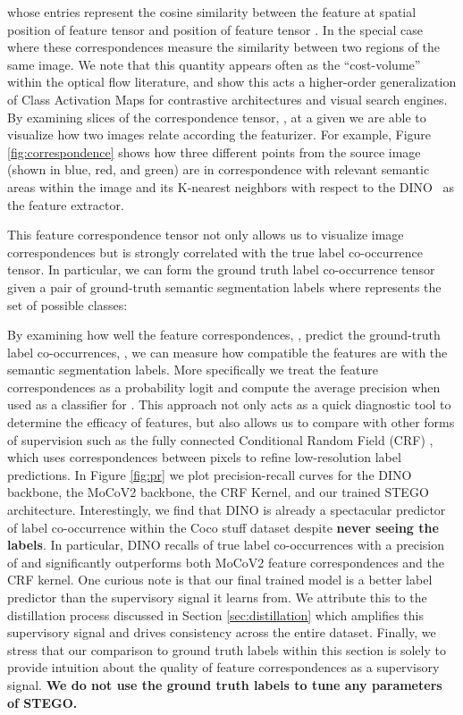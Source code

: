 \documentclass{article} \usepackage{iclr2022_conference,times}
\begin{document}
whose entries represent the cosine similarity between the feature at spatial position  of feature tensor  and position  of feature tensor . In the special case where  these correspondences measure the similarity between two regions of the same image. We note that this quantity appears often as the ``cost-volume'' within the optical flow literature, and \cite{hamilton2021model} show this acts a higher-order generalization of Class Activation Maps \citep{cam} for contrastive architectures and visual search engines. By examining slices of the correspondence tensor, , at a given  we are able to visualize how two images relate according the featurizer. For example, Figure \ref{fig:correspondence} shows how three different points from the source image (shown in blue, red, and green) are in correspondence with relevant semantic areas within the image and its K-nearest neighbors with respect to the DINO~\citep{dino} as the feature extractor.

This feature correspondence tensor not only allows us to visualize image correspondences but is strongly correlated with the true label co-occurrence tensor. In particular, we can form the ground truth label co-occurrence tensor given a pair of ground-truth semantic segmentation labels  where  represents the set of possible classes:

By examining how well the feature correspondences, , predict the ground-truth label co-occurrences, , we can measure how compatible the features are with the semantic segmentation labels. More specifically we treat the feature correspondences as a probability logit and compute the average precision when used as a classifier for . This approach not only acts as a quick diagnostic tool to determine the efficacy of features, but also allows us to compare with other forms of supervision such as the fully connected Conditional Random Field (CRF) \citep{fullcrf}, which uses correspondences between pixels to refine low-resolution label predictions. In Figure \ref{fig:pr} we plot precision-recall curves for the DINO backbone, the MoCoV2 backbone, the CRF Kernel, and our trained STEGO architecture. Interestingly, we find that DINO is already a spectacular predictor of label co-occurrence within the Coco stuff dataset despite \textbf{never seeing the labels}. In particular, DINO recalls  of true label co-occurrences with a precision of  and significantly outperforms both MoCoV2 feature correspondences and the CRF kernel. One curious note is that our final trained model is a better label predictor than the supervisory signal it learns from. We attribute this to the distillation process discussed in Section \ref{sec:distillation} which amplifies this supervisory signal and drives consistency across the entire dataset. Finally, we stress that our comparison to ground truth labels within this section is solely to provide intuition about the quality of feature correspondences as a supervisory signal. \textbf{We do not use the ground truth labels to tune any parameters of STEGO.}
\end{document}
